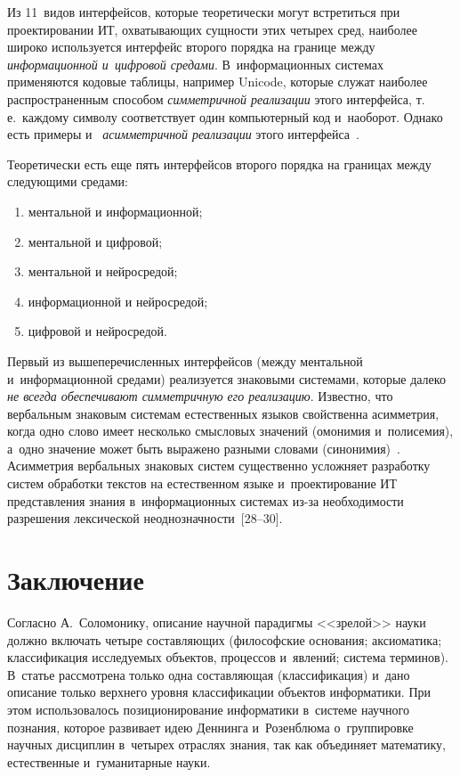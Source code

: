 {\begin{multicols}{2}
  Из 11~видов интерфейсов, которые теоретически могут встретиться при 
проектировании ИТ, охва\-ты\-ва\-ющих сущности этих четырех сред, наиболее 
широко используется интерфейс второго порядка на границе между 
\textit{информационной и~циф\-ро\-вой средами}. В~информационных сис\-те\-мах 
применяются кодовые таб\-ли\-цы, например Unicode, которые служат наиболее 
распространенным способом \textit{сим\-мет\-рич\-ной реализации} этого 
интерфейса, т.\,е.\ каж\-до\-му символу соответствует один компьютерный код 
и~наоборот. Однако есть примеры и~ \textit{асим\-мет\-рич\-ной реализации} 
этого интерфейса~\cite[с.~222--227]{26-zac}.
  
  Теоретически есть еще пять интерфейсов второго порядка на границах 
между следующими сре\-дами:
  \begin{enumerate}[(1)]
  \item ментальной и информационной;
  \item ментальной и цифровой;
  \item ментальной и нейросредой;
  \item информационной и нейросредой;
  \item цифровой и нейросредой.
  \end{enumerate}
  
  Первый из вышеперечисленных интерфейсов (между ментальной 
и~информационной средами) реализуется знаковыми сис\-те\-ма\-ми, которые 
далеко \textit{не всегда обеспечивают сим\-мет\-рич\-ную его реализацию}. 
Известно, что вербальным знаковым сис\-те\-мам естественных языков 
свойственна асим\-мет\-рия, когда одно слово имеет несколько смыс\-ло\-вых 
значений (омонимия и~полисемия), а~одно значение может быть выражено 
разными словами (синонимия)~\cite[с.~47]{27-zac}. Асим\-мет\-рия вербальных 
знаковых сис\-тем существенно услож\-ня\-ет разработку сис\-тем обработки 
текс\-тов на естественном языке и~проектирование ИТ пред\-став\-ле\-ния знания 
в~информационных сис\-те\-мах из-за не\-об\-хо\-ди\-мости разрешения лексической 
не\-од\-но\-знач\-ности~[28--30].
  
\section{Заключение} %
  
  Согласно А.~Соломонику, описание научной парадигмы <<зрелой>> 
науки долж\-но включать четыре со\-став\-ля\-ющих (философские основания; 
аксиоматика; классификация ис\-сле\-ду\-емых объектов, процессов и~явлений; 
система терминов). В~\mbox{статье} рас\-смот\-ре\-на только одна со\-став\-ля\-ющая 
(классификация) и~дано описание только верх\-не\-го уровня классификации 
объектов информатики. При этом использовалось позиционирование 
информатики в~сис\-те\-ме научного познания, которое развивает идею 
Деннинга и~Розенблюма о~группировке научных дис\-цип\-лин в~четырех 
отраслях знания, так как объединяет математику, естественные 
и~гуманитарные науки.
  

\end{multicols}}
